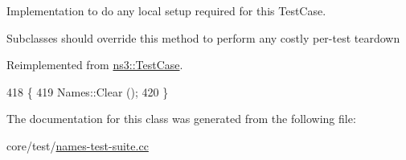 Implementation to do any local setup required for this Test\+Case. 

Subclasses should override this method to perform any costly per-\/test teardown 

Reimplemented from \hyperlink{classns3_1_1TestCase_a8917f1604e28d312a8086f76291e3c46}{ns3\+::\+Test\+Case}.


\begin{DoxyCode}
418 \{
419   Names::Clear ();
420 \}
\end{DoxyCode}


The documentation for this class was generated from the following file\+:\begin{DoxyCompactItemize}
\item 
core/test/\hyperlink{names-test-suite_8cc}{names-\/test-\/suite.\+cc}\end{DoxyCompactItemize}
